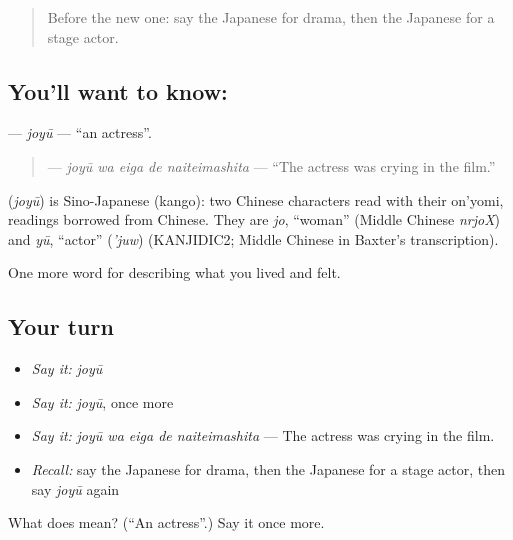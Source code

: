 \begin{quote}
Before the new one: say the Japanese for drama, then the Japanese for a stage actor.
\end{quote}

\subsection*{You'll want to know: }
\textbf{} — \emph{joyū} — \textquotedblleft{}an actress\textquotedblright{}.

\begin{quote}
\textbf{  } — \emph{joyū wa eiga de naiteimashita} — \textquotedblleft{}The actress was crying in the film.\textquotedblright{}
\end{quote}

\begin{cousinweb}
\textbf{} (\emph{joyū}) is Sino-Japanese (kango): two Chinese characters read with their on'yomi, readings borrowed from Chinese. They are \emph{jo}, \textquotedblleft{}woman\textquotedblright{} (Middle Chinese \emph{nrjoX}) and \emph{yū}, \textquotedblleft{}actor\textquotedblright{} (\emph{'juw}) (KANJIDIC2; Middle Chinese in Baxter's transcription).
\end{cousinweb}

\begin{grammarlens}[title={What you've built}]
One more word for describing what you lived and felt.
\end{grammarlens}

\subsection*{Your turn}
\begin{itemize}
\raggedright
  \item \emph{Say it:} \emph{joyū}
  \item \emph{Say it:} \emph{joyū}, once more
  \item \emph{Say it:} \emph{joyū wa eiga de naiteimashita} — The actress was crying in the film.
  \item \emph{Recall:} say the Japanese for drama, then the Japanese for a stage actor, then say \emph{joyū} again
\end{itemize}

\begin{tcolorbox}[breakable,colback=teal!4,colframe=teal!35!black,title={Before you move on}]
What does  mean? (\textquotedblleft{}An actress\textquotedblright{}.) Say it once more.
\end{tcolorbox}
